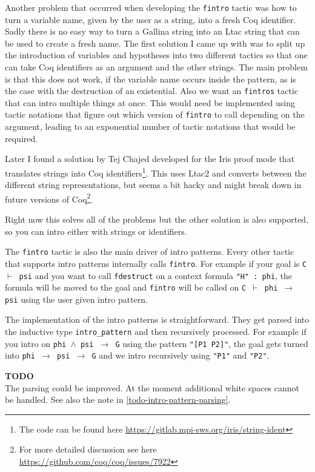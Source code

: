 \documentclass[12pt, a4paper]{article}
\newcommand{\coq}[1]{\texttt{#1}}
\newcommand{\improve}[1]{
	\vspace{3pt}
	\begin{boximprove}
		\parbox{\textwidth}{\textcolor{colorimprove}{\textbf{TODO}\\#1}}
	\end{boximprove}}
\begin{document}
\medskip\noindent
Another problem that occurred when developing the \texttt{fintro} tactic was how to turn a variable name, given by the user as a string, into a fresh Coq identifier.
Sadly there is no easy way to turn a Gallina string into an Ltac string that can be used to create a fresh name.
The first solution I came up with was to split up the introduction of variables and hypotheses into two different tactics  so that one can take Coq identifiers as an argument and the other strings.
The main problem is that this does not work, if the variable name occurs inside the pattern, as is the case with the destruction of an existential.
Also we want an \texttt{fintros} tactic that can intro multiple things at once.
This would need be implemented using tactic notations that figure out which version of \texttt{fintro} to call depending on the argument, leading to an exponential number of tactic notations that would be required.

Later I found a solution by Tej Chajed developed for the Iris proof mode that translates strings into Coq identifiers\footnote{The code can be found here \url{https://gitlab.mpi-sws.org/iris/string-ident}}.
This uses Ltac2 and converts between the different string representations, but seems a bit hacky and might break down in future versions of Coq\footnote{For more detailed discussion see here \url{https://github.com/coq/coq/issues/7922}}.

Right now this solves all of the problems but the other solution is also supported, so you can intro either with strings or identifiers.

\medskip\noindent
The \texttt{fintro} tactic is also the main driver of intro patterns.
Every other tactic that supports intro patterns internally calls \texttt{fintro}.
For example if your goal is \texttt{C $\vdash$ psi} and you want to call \texttt{fdestruct} on a context formula \coq{"H" : phi}, the formula will be moved to the goal and \texttt{fintro} will be called on \texttt{C $\vdash$ phi $\to$ psi} using the user given intro pattern.

The implementation of the intro patterns is straightforward.
They get parsed into the inductive type \texttt{intro\_pattern} and then recursively processed.
For example if you intro on \texttt{phi $\land$ psi $\to$ G} using the pattern \coq{"[P1 P2]"}, the goal gets turned into \texttt{phi $\to$ psi $\to$ G} and we intro recursively using \coq{"P1"} and \coq{"P2"}.

\improve{The parsing could be improved. At the moment additional white spaces cannot be handled. See also the note in \ref{todo-intro-pattern-parsing}.}
\end{document}
